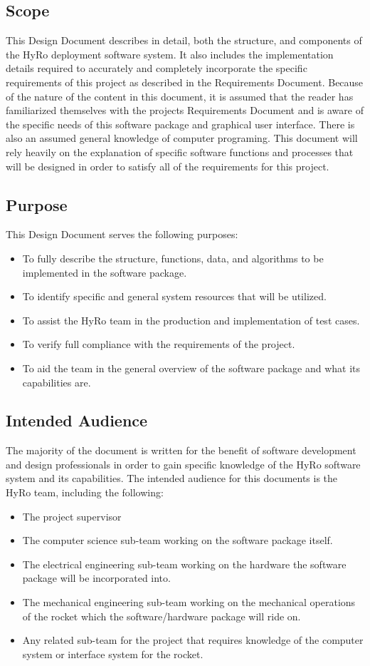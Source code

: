 \documentclass[10pt,draftclsnofoot,onecolumn,compsoc]{IEEEtran}
\begin{document}
\subsection{Scope}
This Design Document describes in detail, both the structure, and components of the HyRo deployment software system. It also includes the implementation details required to accurately and completely incorporate the specific requirements of this project as described in the Requirements Document. Because of the nature of the content in this document, it is assumed that the reader has familiarized themselves with the projects Requirements Document and is aware of the specific needs of this software package and graphical user interface. There is also an assumed general knowledge of computer programing. This document will rely heavily on the explanation of specific software functions and processes that will be designed in order to satisfy all of the requirements for this project. 
\subsection{Purpose}
This Design Document serves the following purposes:
\begin{itemize}
	\item To fully describe the structure, functions, data, and algorithms to be implemented in the software package.
	\item To identify specific and general system resources that will be utilized.
	\item To assist the HyRo team in the production and implementation of test cases.
	\item To verify full compliance with the requirements of the project.
	\item To aid the team in the general overview of the software package and what its capabilities are.
\end{itemize}
\subsection{Intended Audience}
The majority of the document is written for the benefit of software development and design professionals in order to gain specific knowledge of the HyRo software system and its capabilities. The intended audience for this documents is the HyRo team, including the following:
\begin{itemize}
	\item The project supervisor 
	\item The computer science sub-team working on the software package itself.
	\item The electrical engineering sub-team working on the hardware the software package will be incorporated into.
	\item The mechanical engineering sub-team working on the mechanical operations of the rocket which the software/hardware package will ride on.
	\item Any related sub-team for the project that requires knowledge of the computer system or interface system for the rocket.
\end{itemize}
\end{document}
